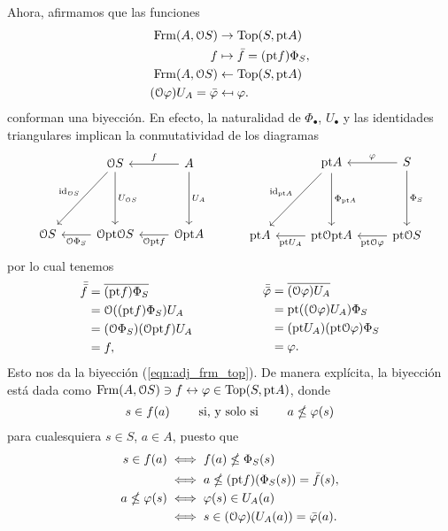 Ahora, afirmamos que las funciones
\begin{align*}
    \mathrm{Frm}(A,\mathcal{O}S) &\to \mathrm{Top}(S,\mathrm{pt} A) \\
    f &\mapsto \bar f = (\mathrm{pt} f)\Phi_S,
    \\
    \mathrm{Frm}(A,\mathcal{O}S) &\leftarrow \mathrm{Top}(S,\mathrm{pt} A) \\
    (\mathcal{O}\varphi)U_A = \bar{\varphi} &\mapsfrom \varphi.
\end{align*}
conforman una biyección.
En efecto,
la naturalidad de $\Phi_\bullet$, $U_\bullet$ y las identidades
triangulares implican la conmutatividad de los diagramas
\[
    \begin{tikzcd}[row sep=15mm]
        & \cal OS \ar[d,"U_{\cal OS}"] \ar[dl,"\id_{\cal OS}"']
        & A \ar[l,"f"'] \ar[d,"U_A"]
        \\
        \cal OS
        & \cal O\pt\cal OS \ar[l,"\cal O\Phi_S"]
        & \cal O\pt A \ar[l,"\cal O\pt f"]
    \end{tikzcd}
    \hspace{10mm}
    \begin{tikzcd}[row sep=15mm]
        & \pt A \ar[d,"\Phi_{\pt A}"] \ar[dl,"\id_{\pt A}"']
        & S \ar[l,"\phi"'] \ar[d,"\Phi_S"]
        \\
        \pt A
        & \pt \cal O\pt A \ar[l,"\pt U_A"]
        & \pt \cal OS \ar[l,"\pt\cal O\phi"]
    \end{tikzcd}
\]
por lo cual tenemos
\[
    \begin{aligned}
        \bar{\bar f}
        &= \ol{(\pt f)\Phi_S} \\
        &= \cal O((\pt f)\Phi_S)U_A \\
        &= (\cal O\Phi_S)(\cal O\pt f)U_A \\
        &= f,
    \end{aligned}
    \hspace{20mm}
    \begin{aligned}
        \bar{\bar\phi}
        &= \ol{(\cal O\phi)U_A} \\
        &= \pt((\cal O\phi)U_A)\Phi_S \\
        &= (\pt U_A)(\pt\cal O\phi)\Phi_S \\
        &= \phi.
    \end{aligned}
\]
Esto nos da la biyección (\ref{eqn:adj_frm_top}).
De manera explícita, la biyección está dada como
$\mathrm{Frm}(A,\mathcal{O}S)\ni f\leftrightarrow \varphi\in \mathrm{Top}(S,\mathrm{pt} A)$, donde
\[
    s\in f(a) \qquad\text{ si, y solo si }\qquad a\nleq \varphi(s)
\]
para cualesquiera $s\in S$, $a\in A$, puesto que
\begin{align*}
    s\in f(a)
    &\iff f(a)\nleq \Phi_S(s) \\
    &\iff a \nleq (\mathrm{pt} f)(\Phi_S(s))=\bar f(s),
    \\
    a\nleq \varphi(s)
    &\iff \varphi(s) \in U_A(a) \\
    &\iff s \in (\mathcal{O}\varphi)(U_A(a)) = \bar{\varphi}(a).
\end{align*}
